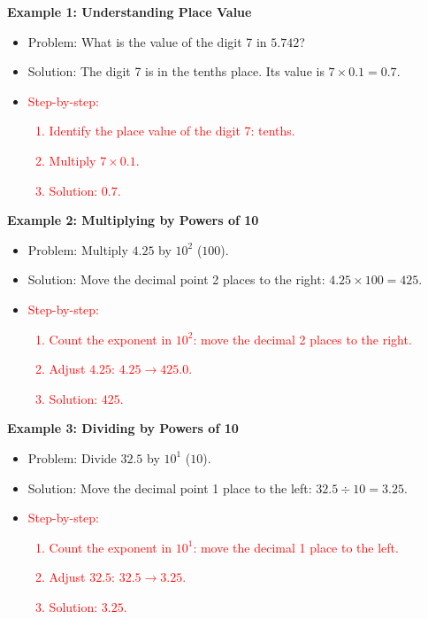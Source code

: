 \documentclass[12pt]{article}
\begin{document}
\begin{tcolorbox}[colframe=black!60, colback=white,
coltitle=black, colbacktitle=black!15, fonttitle=\bfseries\Large,
title=Examples, halign title=center, left=10pt, right=10pt, top=10pt, bottom=15pt]
\textbf{Example 1: Understanding Place Value}
\begin{itemize}
    \item Problem: What is the value of the digit 7 in \(5.742\)?
    \item Solution: The digit 7 is in the tenths place. Its value is \(7 \times 0.1 = 0.7\).
    \item \textcolor{red}{Step-by-step:
        \begin{enumerate}
            \item Identify the place value of the digit 7: tenths.
            \item Multiply \(7 \times 0.1\).
            \item Solution: \(0.7\).
        \end{enumerate}}
\end{itemize}

\textbf{Example 2: Multiplying by Powers of 10}
\begin{itemize}
    \item Problem: Multiply \(4.25\) by \(10^2\) (\(100\)).
    \item Solution: Move the decimal point 2 places to the right: \(4.25 \times 100 = 425\).
    \item \textcolor{red}{Step-by-step:
        \begin{enumerate}
            \item Count the exponent in \(10^2\): move the decimal 2 places to the right.
            \item Adjust \(4.25\): \(4.25 \to 425.0\).
            \item Solution: \(425\).
        \end{enumerate}}
\end{itemize}

\textbf{Example 3: Dividing by Powers of 10}
\begin{itemize}
    \item Problem: Divide \(32.5\) by \(10^1\) (\(10\)).
    \item Solution: Move the decimal point 1 place to the left: \(32.5 \div 10 = 3.25\).
    \item \textcolor{red}{Step-by-step:
        \begin{enumerate}
            \item Count the exponent in \(10^1\): move the decimal 1 place to the left.
            \item Adjust \(32.5\): \(32.5 \to 3.25\).
            \item Solution: \(3.25\).
        \end{enumerate}}
\end{itemize}
\end{tcolorbox}
\end{document}
